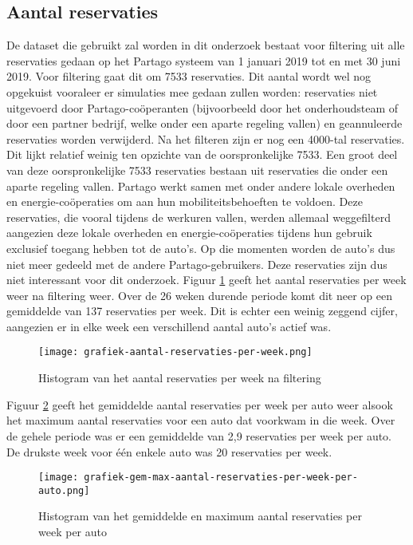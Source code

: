 \subsection{Aantal reservaties}
De dataset die gebruikt zal worden in dit onderzoek bestaat voor filtering uit alle reservaties gedaan op het Partago systeem van 1 januari 2019 tot en met 30 juni 2019. Voor filtering gaat dit om 7533 reservaties. Dit aantal wordt wel nog opgekuist vooraleer er simulaties mee gedaan zullen worden: reservaties niet uitgevoerd door Partago-coöperanten (bijvoorbeeld door het onderhoudsteam of door een partner bedrijf, welke onder een aparte regeling vallen) en geannuleerde reservaties worden verwijderd. Na het filteren zijn er nog een 4000-tal reservaties. Dit lijkt relatief weinig ten opzichte van de oorspronkelijke 7533. Een groot deel van deze oorspronkelijke 7533 reservaties bestaan uit reservaties die onder een aparte regeling vallen. Partago werkt samen met onder andere lokale overheden en energie-coöperaties om aan hun mobiliteitsbehoeften te voldoen. Deze reservaties, die vooral tijdens de werkuren vallen, werden allemaal weggefilterd aangezien deze lokale overheden en energie-coöperaties tijdens hun gebruik exclusief toegang hebben tot de auto's. Op die momenten worden de auto's dus niet meer gedeeld met de andere Partago-gebruikers. Deze reservaties zijn dus niet interessant voor dit onderzoek.
Figuur \ref{grafiek:aantal-reservaties-per-week} geeft het aantal reservaties per week weer na filtering weer. Over de 26 weken durende periode komt dit neer op een gemiddelde van 137 reservaties per week. Dit is echter een weinig zeggend cijfer, aangezien er in elke week een verschillend aantal auto's actief was. 
\begin{figure}[p]
	\texttt{[image: grafiek-aantal-reservaties-per-week.png]}
	\caption[Histogram van het aantal reservaties per week na filtering]{Histogram van het aantal reservaties per week na filtering}
	\label{grafiek:aantal-reservaties-per-week}
\end{figure}
Figuur \ref{grafiek:aantal-reservaties-per-week-per-auto} geeft het gemiddelde aantal reservaties per week per auto weer alsook het maximum aantal reservaties voor een auto dat voorkwam in die week. Over de gehele periode was er een gemiddelde van 2,9 reservaties per week per auto. De drukste week voor één enkele auto was 20 reservaties per week. 
\begin{figure}[p]
	\texttt{[image: grafiek-gem-max-aantal-reservaties-per-week-per-auto.png]}
	\caption[Histogram van het gemiddelde en maximum aantal reservaties per week per auto]{Histogram van het gemiddelde en maximum aantal reservaties per week per auto}
	\label{grafiek:aantal-reservaties-per-week-per-auto}
\end{figure}

